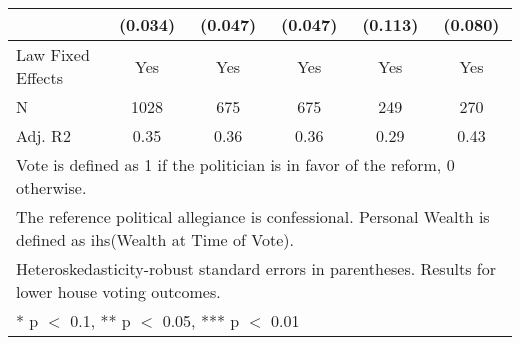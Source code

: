 \begin{table}
\begin{tabular}[t]{lccccc}
 & (\num{0.034}) & (\num{0.047}) & (\num{0.047}) & (\num{0.113}) & (\num{0.080})\\
\midrule
Law Fixed Effects & Yes & Yes & Yes & Yes & Yes\\
N & \num{1028} & \num{675} & \num{675} & \num{249} & \num{270}\\
Adj. R2 & \num{0.35} & \num{0.36} & \num{0.36} & \num{0.29} & \num{0.43}\\
\bottomrule
\multicolumn{6}{l}{\rule{0pt}{1em}Vote is defined as 1 if the politician is in favor of the reform, 0 otherwise.}\\
\multicolumn{6}{l}{\rule{0pt}{1em}The reference political allegiance is confessional. Personal Wealth is defined as ihs(Wealth at Time of Vote).}\\
\multicolumn{6}{l}{\rule{0pt}{1em}Heteroskedasticity-robust standard errors in parentheses. Results for lower house voting outcomes.}\\
\multicolumn{6}{l}{\rule{0pt}{1em}* p $<$ 0.1, ** p $<$ 0.05, *** p $<$ 0.01}\\
\end{tabular}
\end{table}

